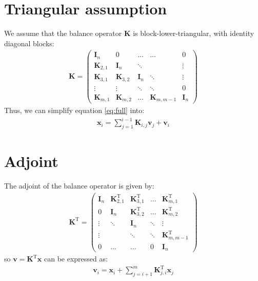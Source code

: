 \documentclass[12pt]{article}
\begin{document}
\section{Triangular assumption}
We assume that the balance operator $\mathbf{K}$ is block-lower-triangular, with identity diagonal blocks:
\begin{align}
\mathbf{K} = \left(\begin{array}{ccccc}
\mathbf{I}_n & 0 & \dots & \dots & 0 \\
\mathbf{K}_{2,1} & \mathbf{I}_n & \ddots & & \vdots \\
\mathbf{K}_{3,1} & \mathbf{K}_{3,2} & \mathbf{I}_n & \ddots & \vdots \\
\vdots & \vdots & \ddots & \ddots & 0 \\
\mathbf{K}_{m,1} & \mathbf{K}_{m,2} & \dots & \mathbf{K}_{m,m-1} & \mathbf{I}_n
\end{array} \right) 
\end{align}
Thus, we can simplify equation \eqref{eq:full} into:
\begin{align}
\label{eq:triangle}
\mathbf{x}_i = \sum_{j=1}^{i-1} \mathbf{K}_{i,j} \mathbf{v}_j + \mathbf{v}_i
\end{align}

\section{Adjoint}
The adjoint of the balance operator is given by: 
\begin{align}
\mathbf{K}^\mathrm{T} = \left(\begin{array}{ccccc}
\mathbf{I}_n & \mathbf{K}^\mathrm{T}_{2,1} & \mathbf{K}^\mathrm{T}_{3,1} & \dots & \mathbf{K}^\mathrm{T}_{m,1} \\
0 & \mathbf{I}_n & \mathbf{K}^\mathrm{T}_{3,2} & \dots & \mathbf{K}^\mathrm{T}_{m,2} \\
\vdots & \ddots & \mathbf{I}_n & \ddots & \vdots \\
\vdots &  & \ddots & \ddots & \mathbf{K}^\mathrm{T}_{m,m-1} \\
0 & \dots & \dots & 0 & \mathbf{I}_n
\end{array} \right) 
\end{align}
so $\mathbf{v} = \mathbf{K}^\mathrm{T} \mathbf{x}$ can be expressed as:
\begin{align}
\label{eq:triangle_ad}
\mathbf{v}_i = \mathbf{x}_i + \sum_{j=i+1}^{m} \mathbf{K}^\mathrm{T}_{j,i} \mathbf{x}_j
\end{align}
\end{document}
